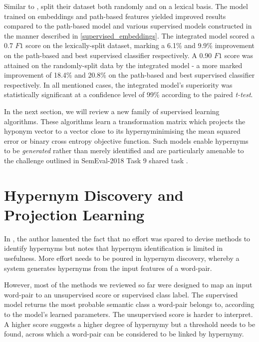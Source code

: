 Similar to \citep{levy2015supervised}, \citeauthor{shwartz2016path} split their dataset both randomly and on a lexical basis.  The model trained on embeddings and path-based features yielded improved results compared to the path-based model and various supervised models constructed in the manner described in \ref{supervised_embeddings}.  The integrated model scored a 0.7 $F1$ score on the lexically-split dataset, marking a 6.1\% and 9.9\% improvement on the path-based and best supervised classifier respectively.  A 0.90 $F1$ score was attained on the randomly-split data by the integrated model -  a more marked improvement of 18.4\% and 20.8\% on the path-based and best supervised classifier respectively.  In all mentioned cases, the integrated model's superiority was statistically significant at a confidence level of 99\% according to the paired \textit{t-test}. 

In the next section, we will review a new family of supervised learning algorithms.  These algorithms learn a transformation matrix which projects the hyponym vector to a vector close to its hypernyminimising
the mean squared error or binary cross entropy objective function.  Such models enable hypernyms to be \textit{generated} rather than merely identified and are particularly amenable to the challenge outlined in SemEval-2018 Task 9 shared task \citep{camacho2018semeval}.

\section{Hypernym Discovery and Projection Learning}
In \citep{camacho2017we}, the author lamented the fact that no effort was spared to devise methods to identify hypernyms but notes that hypernym identification is limited in usefulness.  More effort needs to be poured in hypernym discovery, whereby a system generates hypernyms from the input features of a word-pair.  

However, most of the methods we reviewed so far were designed to map an input word-pair to an unsupervised score or supervised class label.  The supervised model returns the most probable semantic class a word-pair belongs to, according to the model’s learned parameters.  The unsupervised score is harder to interpret.  A higher score suggests a higher degree of hypernymy but a threshold needs to be found, across which a word-pair can be considered to be linked by hypernymy.  

